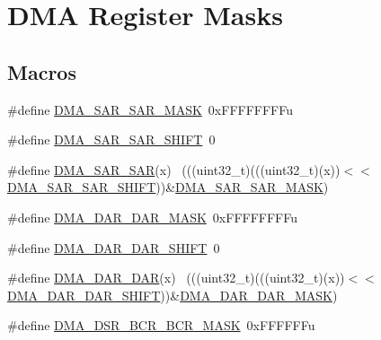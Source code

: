 \hypertarget{group___d_m_a___register___masks}{}\section{D\+MA Register Masks}
\label{group___d_m_a___register___masks}
\subsection*{Macros}
\begin{DoxyCompactItemize}
\item 
\#define \hyperlink{group___d_m_a___register___masks_ga990e3ca99cc1d75f5942432959953048}{D\+M\+A\+\_\+\+S\+A\+R\+\_\+\+S\+A\+R\+\_\+\+M\+A\+SK}~0x\+F\+F\+F\+F\+F\+F\+F\+Fu
\item 
\#define \hyperlink{group___d_m_a___register___masks_ga869308e6de564860ede4d607b19bce31}{D\+M\+A\+\_\+\+S\+A\+R\+\_\+\+S\+A\+R\+\_\+\+S\+H\+I\+FT}~0
\item 
\#define \hyperlink{group___d_m_a___register___masks_gac47d99af8e118e771379d8d4888c1543}{D\+M\+A\+\_\+\+S\+A\+R\+\_\+\+S\+AR}(x)                                                  ~(((uint32\+\_\+t)(((uint32\+\_\+t)(x))$<$$<$\hyperlink{group___d_m_a___register___masks_ga869308e6de564860ede4d607b19bce31}{D\+M\+A\+\_\+\+S\+A\+R\+\_\+\+S\+A\+R\+\_\+\+S\+H\+I\+FT}))\&\hyperlink{group___d_m_a___register___masks_ga990e3ca99cc1d75f5942432959953048}{D\+M\+A\+\_\+\+S\+A\+R\+\_\+\+S\+A\+R\+\_\+\+M\+A\+SK})
\item 
\#define \hyperlink{group___d_m_a___register___masks_gad24e68800bcb03e0d2ffad9b026d5c28}{D\+M\+A\+\_\+\+D\+A\+R\+\_\+\+D\+A\+R\+\_\+\+M\+A\+SK}~0x\+F\+F\+F\+F\+F\+F\+F\+Fu
\item 
\#define \hyperlink{group___d_m_a___register___masks_ga6dc575769385f559893116dabe37a002}{D\+M\+A\+\_\+\+D\+A\+R\+\_\+\+D\+A\+R\+\_\+\+S\+H\+I\+FT}~0
\item 
\#define \hyperlink{group___d_m_a___register___masks_ga3a7525dcb66de97f281da1363f3acde4}{D\+M\+A\+\_\+\+D\+A\+R\+\_\+\+D\+AR}(x)                                                  ~(((uint32\+\_\+t)(((uint32\+\_\+t)(x))$<$$<$\hyperlink{group___d_m_a___register___masks_ga6dc575769385f559893116dabe37a002}{D\+M\+A\+\_\+\+D\+A\+R\+\_\+\+D\+A\+R\+\_\+\+S\+H\+I\+FT}))\&\hyperlink{group___d_m_a___register___masks_gad24e68800bcb03e0d2ffad9b026d5c28}{D\+M\+A\+\_\+\+D\+A\+R\+\_\+\+D\+A\+R\+\_\+\+M\+A\+SK})
\item 
\#define \hyperlink{group___d_m_a___register___masks_ga51f1a407dbca889f0b21bb1eeaa1c5d0}{D\+M\+A\+\_\+\+D\+S\+R\+\_\+\+B\+C\+R\+\_\+\+B\+C\+R\+\_\+\+M\+A\+SK}~0x\+F\+F\+F\+F\+F\+Fu

\end{DoxyCompactItemize}
